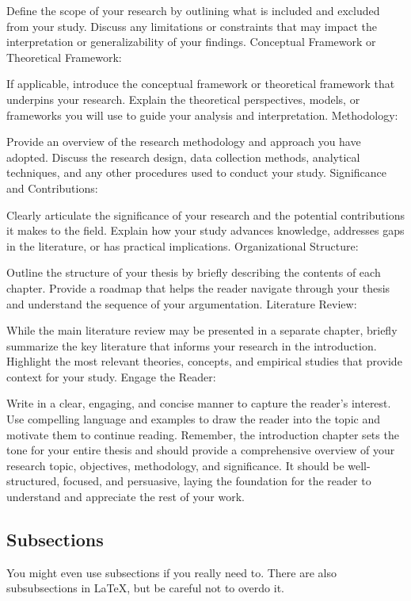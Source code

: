 Define the scope of your research by outlining what is included and excluded from your study. Discuss any limitations or constraints that may impact the interpretation or generalizability of your findings.
Conceptual Framework or Theoretical Framework:

If applicable, introduce the conceptual framework or theoretical framework that underpins your research. Explain the theoretical perspectives, models, or frameworks you will use to guide your analysis and interpretation.
Methodology:

Provide an overview of the research methodology and approach you have adopted. Discuss the research design, data collection methods, analytical techniques, and any other procedures used to conduct your study.
Significance and Contributions:

Clearly articulate the significance of your research and the potential contributions it makes to the field. Explain how your study advances knowledge, addresses gaps in the literature, or has practical implications.
Organizational Structure:

Outline the structure of your thesis by briefly describing the contents of each chapter. Provide a roadmap that helps the reader navigate through your thesis and understand the sequence of your argumentation.
Literature Review:

While the main literature review may be presented in a separate chapter, briefly summarize the key literature that informs your research in the introduction. Highlight the most relevant theories, concepts, and empirical studies that provide context for your study.
Engage the Reader:

Write in a clear, engaging, and concise manner to capture the reader's interest. Use compelling language and examples to draw the reader into the topic and motivate them to continue reading.
Remember, the introduction chapter sets the tone for your entire thesis and should provide a comprehensive overview of your research topic, objectives, methodology, and significance. It should be well-structured, focused, and persuasive, laying the foundation for the reader to understand and appreciate the rest of your work.

\subsection{Subsections}
You might even use subsections if you really need to.
There are also subsubsections in \LaTeX, but be careful not to overdo it.

